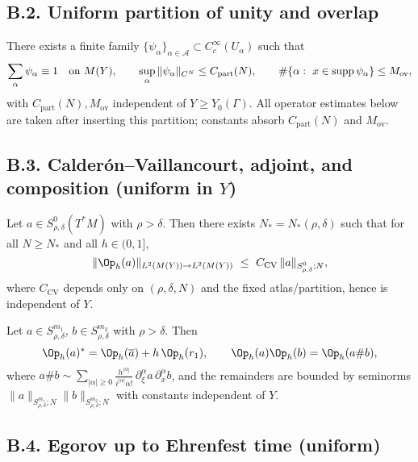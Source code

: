 \subsection*{B.2. Uniform partition of unity and overlap}
\label{subsec:B2-partition}

There exists a finite family $\{\psi_\alpha\}_{\alpha\in\mathcal A}\subset C_c^\infty(U_\alpha)$ such that
\[
\sum_{\alpha}\psi_\alpha\equiv1\quad\text{on }M(Y),\qquad
\sup_\alpha \|\psi_\alpha\|_{C^{N}}\le C_{\mathrm{part}}(N),\qquad
\#\{\alpha:\ x\in\operatorname{supp}\psi_\alpha\}\le M_{\mathrm{ov}},
\]
with $C_{\mathrm{part}}(N),M_{\mathrm{ov}}$ independent of $Y\ge Y_0(\Gamma)$. All operator estimates below are taken after inserting this partition; constants absorb $C_{\mathrm{part}}(N)$ and $M_{\mathrm{ov}}$.

\subsection*{B.3. Calderón–Vaillancourt, adjoint, and composition (uniform in $Y$)}
\label{subsec:B3-CV}

\begin{theorem}
\label{thm:B-CV}
Let $a\in S^0_{\rho,\delta}(T^*M)$ with $\rho>\delta$. Then there exists $N_*=N_*(\rho,\delta)$ such that for all $N\ge N_*$ and all $h\in(0,1]$,
\[
\|\Op_h(a)\|_{L^2(M(Y))\to L^2(M(Y))}\ \le\ C_{\mathrm{CV}}\,\|a\|_{S^0_{\rho,\delta};N},
\]
where $C_{\mathrm{CV}}$ depends only on $(\rho,\delta,N)$ and the fixed atlas/partition, hence is independent of $Y$.
\end{theorem}

\begin{lemma}
\label{lem:B-adj-comp}
Let $a\in S^{m_1}_{\rho,\delta}$, $b\in S^{m_2}_{\rho,\delta}$ with $\rho>\delta$. Then
\[
\Op_h(a)^*=\Op_h(\overline a)+h\,\Op_h(r_1),\qquad
\Op_h(a)\Op_h(b)=\Op_h(a\# b),
\]
where $a\# b\sim \sum_{|\alpha|\ge0}\frac{h^{|\alpha|}}{i^{|\alpha|}\alpha!}\,\partial_\xi^\alpha a\,\partial_x^\alpha b$,
and the remainders are bounded by seminorms $\|a\|_{S^{m_1}_{\rho,\delta};N}\|b\|_{S^{m_2}_{\rho,\delta};N}$ with constants independent of $Y$.
\end{lemma}

\subsection*{B.4. Egorov up to Ehrenfest time (uniform)}
\label{subsec:B4-egorov}

